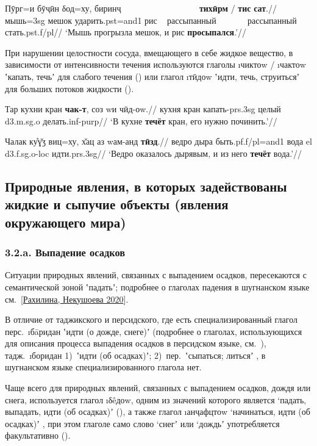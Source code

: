 \begingl
\gla Пӯрг=и бӯҷӣн δод=ху, биринҷ ~~~~~~~~~~~~~~~~~ \textbf{тихӣрм} / \textbf{тис} \textbf{сат}.//
\glc мышь={\sc 3sg} мешок ударить.{\sc pst=and1} рис ~ рассыпанный ~~~~~~ рассыпанный стать.{\sc pst.f/pl}//
\glft ‘Мышь прогрызла мешок, и рис \textbf{просыпался}.’//
\endgl \xe

При нарушении целостности сосуда, вмещающего в себе жидкое вещество, в зависимости от интенсивности течения используются глаголы \i{чиктоw} / \i{чактоw} ʽкапать, течьʼ для слабого течения () или глагол \i{тӣдоw} ʽидти, течь, струитьсяʼ для больших потоков жидкости ().

\begingl
\gla Тар кухни кран \textbf{чак-т}, соз wи чӣд-оw.//
 кухня кран капать-{\sc prs.3sg} целый {\sc d3.m.sg.o} делать.{\sc inf-purp}//
\glft ‘В кухне \textbf{течёт} кран, его нужно починить.’//
\endgl \xe

\begingl
\gla Чалак ку̊ɣ̌ӡ виц=ху, х̌ац аз wам-анд \textbf{тӣзд}.//
\glc ведро дыра быть.{\sc pf.f/pl=and1} вода {\sc el} {\sc d3.f.sg.o-loc} идти.{\sc prs.3sg}//
\glft ‘Ведро оказалось дырявым, и из него \textbf{течёт} вода.’//
\endgl \xe

\subsection{Природные явления, в которых задействованы жидкие и сыпучие объекты (явления окружающего мира)} \label{pour-32}

\subsubsection{3.2.a. Выпадение осадков} \label{pour-32a}

Ситуации природных явлений, связанных с выпадением осадков, пересекаются с семантической зоной ʽпадатьʼ; подробнее о глаголах падения в шугнанском языке см.~[\hyperref[chapter-rakh-down]{Рахилина, Некушоева 2020}].

В отличие от таджикского и персидского, где есть специализированный глагол перс.~\i{бāридан} ʽидти (о дожде, снеге)ʼ \parencite{rubinchik1983} (подробнее о глаголах, использующихся для описания процесса выпадения осадков в персидском языке, см.~\parencite{armand_nikitenko2020}), тадж.~\i{боридан} 1)~ʽидти (об осадках)ʼ; 2)~пер.~ʽсыпаться; литьсяʼ \parencite[157]{mirboboev2006}, в шугнанском языке специализированного глагола нет.

Чаще всего для природных явлений, связанных с выпадением осадков, дождя или снега, используется глагол \i{δêдоw}, одним из значений которого является ‘падать, выпадать, идти (об осадках)ʼ \parencite[501–502]{karamshoev1988} (), а также глагол \i{анҷафцтоw} ‘начинаться, идти (об осадках)ʼ \parencite[107]{karamshoev1988}, при этом глаголе само слово ‘снегʼ или ‘дождьʼ употребляется факультативно ().

